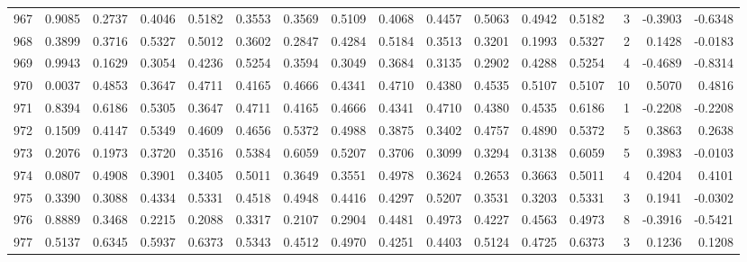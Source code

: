 \begin{tabular}{lrrrrrrrrrrrrrrr}
967 &      0.9085 &  0.2737 &  0.4046 &  0.5182 &  0.3553 &  0.3569 &  0.5109 &  0.4068 &  0.4457 &  0.5063 &   0.4942 &     0.5182 &      3 &                   -0.3903 &                    -0.6348 \\
968 &      0.3899 &  0.3716 &  0.5327 &  0.5012 &  0.3602 &  0.2847 &  0.4284 &  0.5184 &  0.3513 &  0.3201 &   0.1993 &     0.5327 &      2 &                    0.1428 &                    -0.0183 \\
969 &      0.9943 &  0.1629 &  0.3054 &  0.4236 &  0.5254 &  0.3594 &  0.3049 &  0.3684 &  0.3135 &  0.2902 &   0.4288 &     0.5254 &      4 &                   -0.4689 &                    -0.8314 \\
970 &      0.0037 &  0.4853 &  0.3647 &  0.4711 &  0.4165 &  0.4666 &  0.4341 &  0.4710 &  0.4380 &  0.4535 &   0.5107 &     0.5107 &     10 &                    0.5070 &                     0.4816 \\
971 &      0.8394 &  0.6186 &  0.5305 &  0.3647 &  0.4711 &  0.4165 &  0.4666 &  0.4341 &  0.4710 &  0.4380 &   0.4535 &     0.6186 &      1 &                   -0.2208 &                    -0.2208 \\
972 &      0.1509 &  0.4147 &  0.5349 &  0.4609 &  0.4656 &  0.5372 &  0.4988 &  0.3875 &  0.3402 &  0.4757 &   0.4890 &     0.5372 &      5 &                    0.3863 &                     0.2638 \\
973 &      0.2076 &  0.1973 &  0.3720 &  0.3516 &  0.5384 &  0.6059 &  0.5207 &  0.3706 &  0.3099 &  0.3294 &   0.3138 &     0.6059 &      5 &                    0.3983 &                    -0.0103 \\
974 &      0.0807 &  0.4908 &  0.3901 &  0.3405 &  0.5011 &  0.3649 &  0.3551 &  0.4978 &  0.3624 &  0.2653 &   0.3663 &     0.5011 &      4 &                    0.4204 &                     0.4101 \\
975 &      0.3390 &  0.3088 &  0.4334 &  0.5331 &  0.4518 &  0.4948 &  0.4416 &  0.4297 &  0.5207 &  0.3531 &   0.3203 &     0.5331 &      3 &                    0.1941 &                    -0.0302 \\
976 &      0.8889 &  0.3468 &  0.2215 &  0.2088 &  0.3317 &  0.2107 &  0.2904 &  0.4481 &  0.4973 &  0.4227 &   0.4563 &     0.4973 &      8 &                   -0.3916 &                    -0.5421 \\
977 &      0.5137 &  0.6345 &  0.5937 &  0.6373 &  0.5343 &  0.4512 &  0.4970 &  0.4251 &  0.4403 &  0.5124 &   0.4725 &     0.6373 &      3 &                    0.1236 &                     0.1208 \\

\end{tabular}
